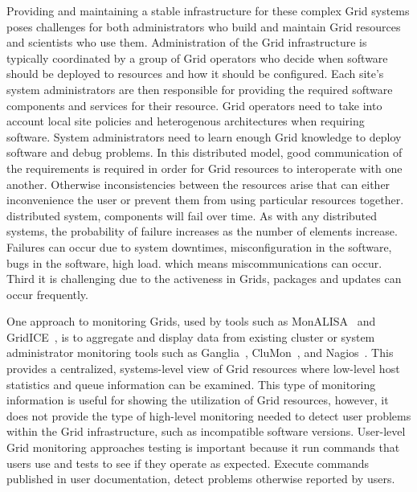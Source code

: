 \documentclass[times, 10pt,twocolumn]{article}
\begin{document}
Providing and maintaining a stable infrastructure for these complex 
Grid systems poses challenges for both administrators who build and
maintain Grid resources and scientists who use them.  
Administration of the Grid infrastructure is typically coordinated by a group 
of Grid operators who decide when software should be deployed to resources and
how it should be configured.  Each site's system administrators are then
responsible for providing the required software components and services for
their resource.  Grid operators need to take into account local site policies
and heterogenous architectures when requiring software.  System administrators
need to learn enough Grid knowledge to deploy software and debug problems.  In
this distributed model, good communication of the requirements is required in
order for Grid resources to interoperate with one another.  Otherwise
inconsistencies between the resources arise that can either inconvenience the
user or prevent them from using particular resources together.
distributed system, components will fail over time.  As with any distributed
systems, the probability of failure increases as the number of elements 
increase.  Failures can occur due to system downtimes, misconfiguration in the 
software, bugs in the software, high load.  
which means miscommunications can occur.  
Third it is challenging due to the
activeness in Grids, packages and updates can occur frequently.

One approach to monitoring Grids, used by tools such as
MonALISA~\cite{monalisa} and GridICE~\cite{gridice}, is to aggregate and
display data from existing cluster or system administrator monitoring tools
such as Ganglia~\cite{ganglia}, CluMon~\cite{clumon}, and
Nagios~\cite{nagios}.  This provides a centralized, systems-level view of Grid
resources where low-level host statistics and queue information can be
examined.  This type of monitoring information is useful for showing the
utilization of Grid resources, however, it does not provide the type of
high-level monitoring needed to detect user problems within the Grid
infrastructure, such as incompatible software versions.  User-level
Grid monitoring approaches testing is important because it run commands that users use and tests
to see if they operate as expected. Execute commands published in user
documentation, detect problems otherwise reported by users.
\end{document}
